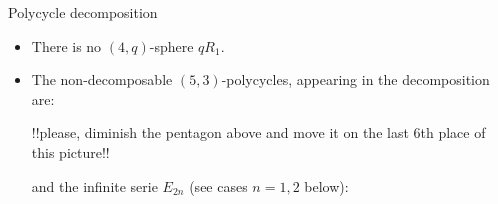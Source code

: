 \documentclass[%
pdf,
colorBG,
slideColor,
]{prosper}
\begin{document}
\begin{slide}{Polycycle decomposition}
\vspace{-3mm}
\begin{itemize}
\item There is no $(4,q)$-sphere $qR_1$.
\item The non-decomposable $(5,3)$-polycycles, appearing in the decomposition are:
\begin{center}
\begin{minipage}{3.4cm}
\centering
{}\par
\end{minipage}
!!please, diminish the pentagon above and move it on the last 6th place of 
this picture!!
\begin{minipage}{3.4cm}
\centering
{}\par
\end{minipage}
\begin{minipage}{3.4cm}
\centering
{}\par
\end{minipage}
\begin{minipage}{3.4cm}
\centering
{}\par
\end{minipage}
\begin{minipage}{3.4cm}
\centering
{}\par
\end{minipage}
\end{center}
and the infinite serie $E_{2n}$ (see cases $n=1,2$ below):
\begin{center}
\begin{minipage}{4.7cm}
\centering
{}\par
\end{minipage}
\begin{minipage}{4.7cm}
\centering
{}\par
\end{minipage}
\end{center}

\end{itemize}
\end{slide}
\end{document}
